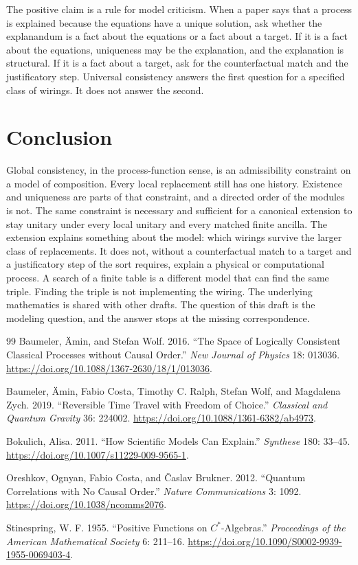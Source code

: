 \documentclass[12pt]{article}
\begin{document}
The positive claim is a rule for model criticism. When a paper says that a process is explained because the equations have a unique solution, ask whether the explanandum is a fact about the equations or a fact about a target. If it is a fact about the equations, uniqueness may be the explanation, and the explanation is structural. If it is a fact about a target, ask for the counterfactual match and the justificatory step. Universal consistency answers the first question for a specified class of wirings. It does not answer the second.

\section{Conclusion}
\label{sec:end}

Global consistency, in the process-function sense, is an admissibility constraint on a model of composition. Every local replacement still has one history. Existence and uniqueness are parts of that constraint, and a directed order of the modules is not. The same constraint is necessary and sufficient for a canonical extension to stay unitary under every local unitary and every matched finite ancilla. The extension explains something about the model: which wirings survive the larger class of replacements. It does not, without a counterfactual match to a target and a justificatory step of the sort \citet{bokulich2011} requires, explain a physical or computational process. A search of a finite table is a different model that can find the same triple. Finding the triple is not implementing the wiring. The underlying mathematics is shared with other drafts. The question of this draft is the modeling question, and the answer stops at the missing correspondence.

\begin{thebibliography}{99}
Baumeler, \"Amin, and Stefan Wolf. 2016. ``The Space of Logically Consistent Classical Processes without Causal Order.'' \emph{New Journal of Physics} 18: 013036. \url{https://doi.org/10.1088/1367-2630/18/1/013036}.

Baumeler, \"Amin, Fabio Costa, Timothy C. Ralph, Stefan Wolf, and Magdalena Zych. 2019. ``Reversible Time Travel with Freedom of Choice.'' \emph{Classical and Quantum Gravity} 36: 224002. \url{https://doi.org/10.1088/1361-6382/ab4973}.

Bokulich, Alisa. 2011. ``How Scientific Models Can Explain.'' \emph{Synthese} 180: 33--45. \url{https://doi.org/10.1007/s11229-009-9565-1}.

Oreshkov, Ognyan, Fabio Costa, and \v{C}aslav Brukner. 2012. ``Quantum Correlations with No Causal Order.'' \emph{Nature Communications} 3: 1092. \url{https://doi.org/10.1038/ncomms2076}.

Stinespring, W. F. 1955. ``Positive Functions on {$C^{*}$}-Algebras.'' \emph{Proceedings of the American Mathematical Society} 6: 211--16. \url{https://doi.org/10.1090/S0002-9939-1955-0069403-4}.
\end{thebibliography}
\end{document}
